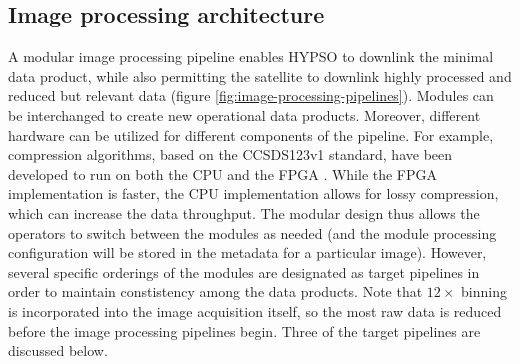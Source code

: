 \subsection{Image processing architecture}

A modular image processing pipeline enables HYPSO to downlink the minimal data product, while also permitting the satellite to downlink highly processed and reduced but relevant data (figure \ref{fig:image-processing-pipelines}).
Modules can be interchanged to create new operational data products.
Moreover, different hardware can be utilized for different components of the pipeline. 
For example, compression algorithms, based on the CCSDS123v1 standard, have been developed to run on both the CPU and the FPGA \cite{Fjeldtvedt2018}. 
While the FPGA implementation is faster, the CPU implementation allows for lossy compression, which can increase the data throughput. 
The modular design thus allows the operators to switch between the modules as needed (and the module processing configuration will be stored in the metadata for a particular image). 
However, several specific orderings of the modules are designated as target pipelines in order to maintain constistency among the data products.
Note that $12\times$ binning is incorporated into the image acquisition itself, so the most raw data is reduced before the image processing pipelines begin.
Three of the target pipelines are discussed below. 


